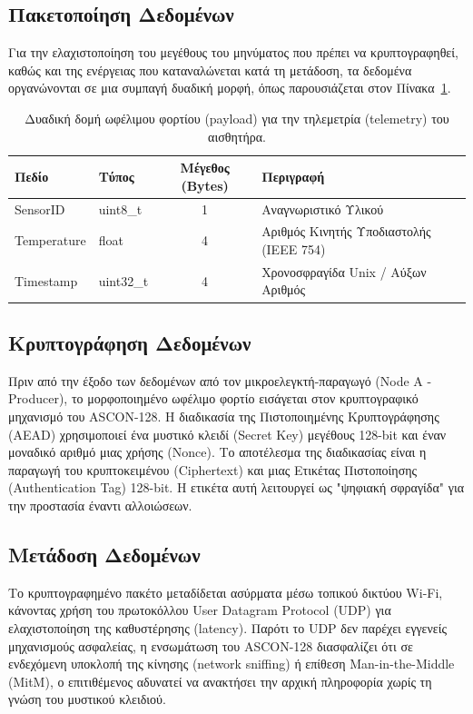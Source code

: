 \documentclass[runningheads]{llncs}
\begin{document}
\subsection{Πακετοποίηση Δεδομένων}
Για την ελαχιστοποίηση του μεγέθους του μηνύματος που πρέπει να κρυπτογραφηθεί, καθώς και της ενέργειας που καταναλώνεται κατά τη μετάδοση, τα δεδομένα οργανώνονται σε μια συμπαγή δυαδική μορφή,
όπως παρουσιάζεται στον Πίνακα~\ref{tab_packet}.

\begin{table}[!ht]
\caption{Δυαδική δομή ωφέλιμου φορτίου (payload) για την τηλεμετρία (telemetry) του αισθητήρα.}
\label{tab_packet}
\centering
\setlength{\tabcolsep}{10pt} %
\begin{tabular}{l l c l}
\toprule
\textbf{Πεδίο} & \textbf{Τύπος} & \textbf{Μέγεθος (Bytes)} & \textbf{Περιγραφή} \\ 
\midrule
SensorID    & uint8\_t  & 1 & Αναγνωριστικό Υλικού \\
Temperature & float     & 4 & Αριθμός Κινητής Υποδιαστολής (IEEE 754) \\
Timestamp   & uint32\_t & 4 & Χρονοσφραγίδα Unix / Αύξων Αριθμός \\ 
\bottomrule
\end{tabular}
\end{table}

\subsection{Κρυπτογράφηση Δεδομένων}
Πριν από την έξοδο των δεδομένων από τον μικροελεγκτή-παραγωγό (Node A - Producer), το μορφοποιημένο ωφέλιμο φορτίο εισάγεται στον κρυπτογραφικό μηχανισμό του ASCON-128. 
Η διαδικασία της Πιστοποιημένης Κρυπτογράφησης (AEAD) χρησιμοποιεί ένα μυστικό κλειδί (Secret Key) μεγέθους 128-bit και έναν μοναδικό αριθμό μιας χρήσης (Nonce). 
Το αποτέλεσμα της διαδικασίας είναι η παραγωγή του κρυπτοκειμένου (Ciphertext) και μιας Ετικέτας Πιστοποίησης (Authentication Tag) 128-bit. Η ετικέτα αυτή λειτουργεί ως "ψηφιακή σφραγίδα" για την προστασία έναντι αλλοιώσεων.

\subsection{Μετάδοση Δεδομένων}
Το κρυπτογραφημένο πακέτο μεταδίδεται ασύρματα μέσω τοπικού δικτύου Wi-Fi, κάνοντας χρήση του πρωτοκόλλου User Datagram Protocol (UDP) για ελαχιστοποίηση της καθυστέρησης (latency). 
Παρότι το UDP δεν παρέχει εγγενείς μηχανισμούς ασφαλείας, η ενσωμάτωση του ASCON-128 διασφαλίζει ότι σε ενδεχόμενη υποκλοπή της κίνησης (network sniffing) ή επίθεση Man-in-the-Middle (MitM),
ο επιτιθέμενος αδυνατεί να ανακτήσει την αρχική πληροφορία χωρίς τη γνώση του μυστικού κλειδιού.
\end{document}
